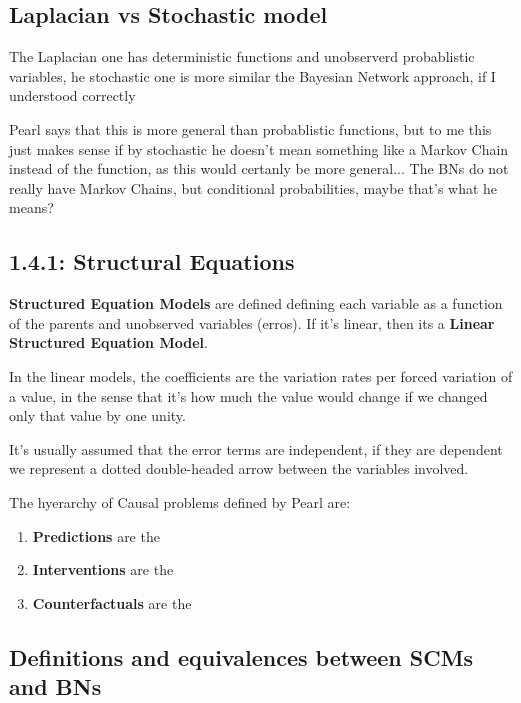 \subsection{Laplacian vs Stochastic model}

The Laplacian one has deterministic functions and unobserverd probablistic variables, he stochastic one is more similar the Bayesian Network approach, if I understood correctly

Pearl says that this is more general than probablistic functions, but to me this just makes sense if by stochastic he doesn't mean something like a Markov Chain instead of the function, as this would certanly be more general... The BNs do not really have Markov Chains, but conditional probabilities, maybe that's what he means?


\subsection{1.4.1: Structural Equations}

\textbf{Structured Equation Models} are defined defining each variable as a function of the parents and unobserved variables (erros). If it's linear, then its a \textbf{Linear Structured Equation Model}.

In the linear models, the coefficients are the variation rates per forced variation of a value, in the sense that it's how much the value would change if we changed only that value by one unity.

It's usually assumed that the error terms are independent, if they are dependent we represent a dotted double-headed arrow between the variables involved.

The hyerarchy of Causal problems defined by Pearl are:

\begin{enumerate}
    \item \textbf{Predictions} are the 
    \item \textbf{Interventions} are the 
    \item \textbf{Counterfactuals} are the 
\end{enumerate}

\subsection{Definitions and equivalences between SCMs and BNs}

